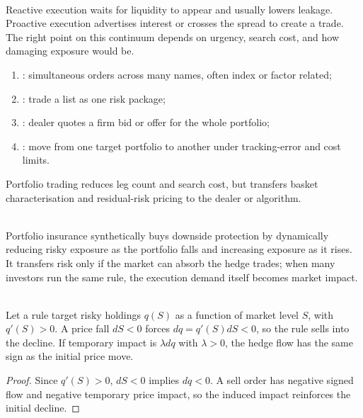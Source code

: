 \documentclass[a4paper,oneside,openany]{book}
\begin{document}
\begin{principle} \\
Reactive execution waits for liquidity to appear and usually lowers leakage. Proactive execution advertises interest or crosses the spread to create a trade. The right point on this continuum depends on urgency, search cost, and how damaging exposure would be.
\end{principle}

\begin{taxonomy} 
\begin{enumerate}[label=\roman*.]
\setlength{\itemsep}{0pt}
\item {}: simultaneous orders across many names, often index or factor related;
\item {}: trade a list as one risk package;
\item {}: dealer quotes a firm bid or offer for the whole portfolio;
\item {}: move from one target portfolio to another under tracking-error and cost limits.
\end{enumerate}
Portfolio trading reduces leg count and search cost, but transfers basket characterisation and residual-risk pricing to the dealer or algorithm.
\end{taxonomy}

\begin{mechanism} \\
Portfolio insurance synthetically buys downside protection by dynamically reducing risky exposure as the portfolio falls and increasing exposure as it rises. It transfers risk only if the market can absorb the hedge trades; when many investors run the same rule, the execution demand itself becomes market impact.
\end{mechanism}

\begin{proposition} \\
Let a rule target risky holdings $q(S)$ as a function of market level $S$, with $q'(S)>0$. A price fall $dS<0$ forces $dq=q'(S)dS<0$, so the rule sells into the decline. If temporary impact is $\lambda dq$ with $\lambda>0$, the hedge flow has the same sign as the initial price move.
\begin{proof}
Since $q'(S)>0$, $dS<0$ implies $dq<0$. A sell order has negative signed flow and negative temporary price impact, so the induced impact reinforces the initial decline.
\end{proof}
\end{proposition}
\end{document}
